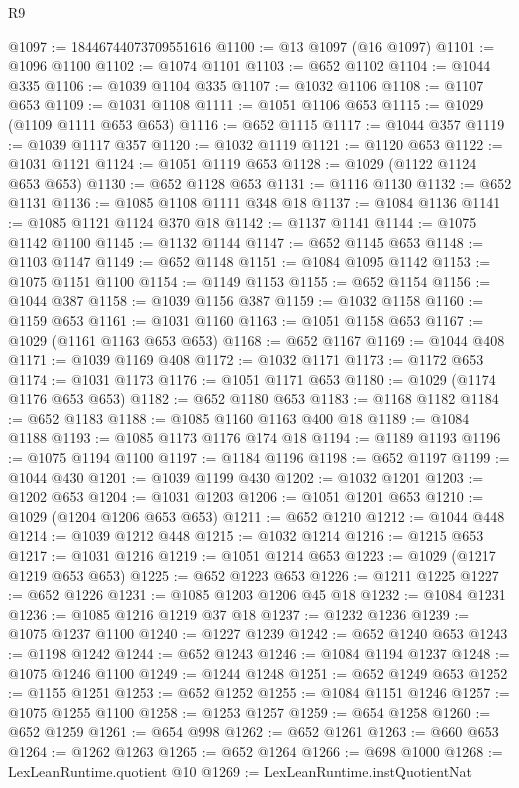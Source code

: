 \begin{lexlean}{R9}
\begin{coremodule}
@1097 := 18446744073709551616
@1100 := @13 @1097 (@16 @1097)
@1101 := @1096 @1100
@1102 := @1074 @1101
@1103 := @652 @1102
@1104 := @1044 @335
@1106 := @1039 @1104 @335
@1107 := @1032 @1106
@1108 := @1107 @653
@1109 := @1031 @1108
@1111 := @1051 @1106 @653
@1115 := @1029 (@1109 @1111 @653 @653)
@1116 := @652 @1115
@1117 := @1044 @357
@1119 := @1039 @1117 @357
@1120 := @1032 @1119
@1121 := @1120 @653
@1122 := @1031 @1121
@1124 := @1051 @1119 @653
@1128 := @1029 (@1122 @1124 @653 @653)
@1130 := @652 @1128 @653
@1131 := @1116 @1130
@1132 := @652 @1131
@1136 := @1085 @1108 @1111 @348 @18
@1137 := @1084 @1136
@1141 := @1085 @1121 @1124 @370 @18
@1142 := @1137 @1141
@1144 := @1075 @1142 @1100
@1145 := @1132 @1144
@1147 := @652 @1145 @653
@1148 := @1103 @1147
@1149 := @652 @1148
@1151 := @1084 @1095 @1142
@1153 := @1075 @1151 @1100
@1154 := @1149 @1153
@1155 := @652 @1154
@1156 := @1044 @387
@1158 := @1039 @1156 @387
@1159 := @1032 @1158
@1160 := @1159 @653
@1161 := @1031 @1160
@1163 := @1051 @1158 @653
@1167 := @1029 (@1161 @1163 @653 @653)
@1168 := @652 @1167
@1169 := @1044 @408
@1171 := @1039 @1169 @408
@1172 := @1032 @1171
@1173 := @1172 @653
@1174 := @1031 @1173
@1176 := @1051 @1171 @653
@1180 := @1029 (@1174 @1176 @653 @653)
@1182 := @652 @1180 @653
@1183 := @1168 @1182
@1184 := @652 @1183
@1188 := @1085 @1160 @1163 @400 @18
@1189 := @1084 @1188
@1193 := @1085 @1173 @1176 @174 @18
@1194 := @1189 @1193
@1196 := @1075 @1194 @1100
@1197 := @1184 @1196
@1198 := @652 @1197
@1199 := @1044 @430
@1201 := @1039 @1199 @430
@1202 := @1032 @1201
@1203 := @1202 @653
@1204 := @1031 @1203
@1206 := @1051 @1201 @653
@1210 := @1029 (@1204 @1206 @653 @653)
@1211 := @652 @1210
@1212 := @1044 @448
@1214 := @1039 @1212 @448
@1215 := @1032 @1214
@1216 := @1215 @653
@1217 := @1031 @1216
@1219 := @1051 @1214 @653
@1223 := @1029 (@1217 @1219 @653 @653)
@1225 := @652 @1223 @653
@1226 := @1211 @1225
@1227 := @652 @1226
@1231 := @1085 @1203 @1206 @45 @18
@1232 := @1084 @1231
@1236 := @1085 @1216 @1219 @37 @18
@1237 := @1232 @1236
@1239 := @1075 @1237 @1100
@1240 := @1227 @1239
@1242 := @652 @1240 @653
@1243 := @1198 @1242
@1244 := @652 @1243
@1246 := @1084 @1194 @1237
@1248 := @1075 @1246 @1100
@1249 := @1244 @1248
@1251 := @652 @1249 @653
@1252 := @1155 @1251
@1253 := @652 @1252
@1255 := @1084 @1151 @1246
@1257 := @1075 @1255 @1100
@1258 := @1253 @1257
@1259 := @654 @1258
@1260 := @652 @1259
@1261 := @654 @998
@1262 := @652 @1261
@1263 := @660 @653
@1264 := @1262 @1263
@1265 := @652 @1264
@1266 := @698 @1000
@1268 := LexLeanRuntime.quotient @10
@1269 := LexLeanRuntime.instQuotientNat

\end{coremodule}
\end{lexlean}
